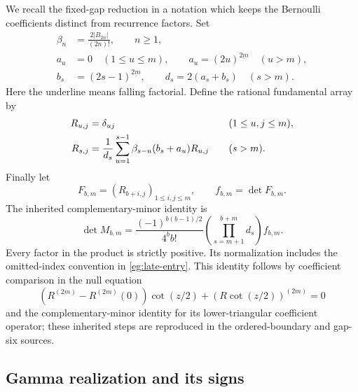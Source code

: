 \documentclass[11pt,a4paper]{article}
\numberwithin{equation}{section}
\theoremstyle{definition}
\theoremstyle{remark}
\begin{document}
We recall the fixed-gap reduction in a notation which keeps the
Bernoulli coefficients distinct from recurrence factors.  Set
\begin{align*}
 \beta_n&=\frac{2|B_{2n}|}{(2n)!},\qquad n\ge1,\\
 a_u&=0\quad(1\le u\le m),\qquad
 a_u=(2u)^{\underline{2m}}\quad(u>m),\\
 b_s&=(2s-1)^{\underline{2m}},\qquad
 d_s=2(a_s+b_s)\quad(s>m).
\end{align*}
Here the underline means falling factorial.  Define the rational
fundamental array by
\begin{align}
 R_{u,j}&=\delta_{uj}&&(1\le u,j\le m),\notag\\
 R_{s,j}&=\frac1{d_s}\sum_{u=1}^{s-1}
      \beta_{s-u}(b_s+a_u)R_{u,j}\quad&&(s>m).
 \label{eg:recurrence}
\end{align}
Finally let
\[
 F_{b,m}=(R_{b+i,j})_{1\le i,j\le m},\qquad f_{b,m}=\det F_{b,m}.
\]
The inherited complementary-minor identity is
\begin{equation}\label{eg:rational-bridge}
 \det M_{b,m}=
 \frac{(-1)^{b(b-1)/2}}{4^bb!}
       \left(\prod_{s=m+1}^{b+m}d_s\right) f_{b,m}.
\end{equation}
Every factor in the product is strictly positive.  Its normalization
includes the omitted-index convention in \eqref{eg:late-entry}.
This identity follows by coefficient comparison in the null equation
\[
 (R^{(2m)}-R^{(2m)}(0))\cot(z/2)
                         +(R\cot(z/2))^{(2m)}=0
\]
and the complementary-minor identity for its lower-triangular
coefficient operator; these inherited steps are reproduced in the
ordered-boundary and gap-six sources.

\subsection{Gamma realization and its signs}
\end{document}
